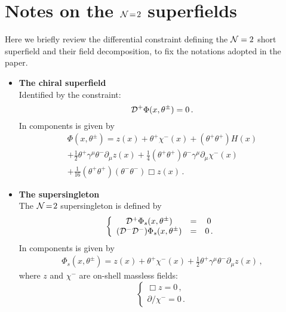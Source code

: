 \documentclass[a4paper,12pt]{article}
\newcommand{\ft}[2]{{\textstyle\frac{#1}{#2}}}
\begin{document}
\section{Notes on the ${\cal N}\!=\!2$ superfields}
Here we briefly review the differential constraint defining the
${\cal N}=2$ short superfield and their field decomposition, to
fix the notations adopted in the paper.
\begin{itemize}
\item {\bf The chiral superfield}\\
Identified by the constraint:
\begin{equation}
{\cal D}^+\Phi(x,\theta^{\pm})=0\,.
\end{equation}
In components is given by
\begin{eqnarray}
\Phi(x,\theta^{\pm})= z(x)+\theta^+\chi^-(x)
+(\theta^+\theta^+)H(x)\nonumber\\
+\ft{1}{2}\theta^+\gamma^\mu\theta^-\partial_\mu z(x)
+\ft{1}{4}(\theta^+\theta^+)\theta^-\gamma^\mu\partial_\mu\chi^-(x)\nonumber\\
+\ft{1}{16}(\theta^+\theta^+)(\theta^-\theta^-)\Box  z(x)\,.
\end{eqnarray}
\item {\bf The supersingleton}\\
The ${\cal N}\!=\!2$ supersingleton is defined by
\begin{equation}
\left\{\begin{array}{ccc}
{\cal D}^+\Phi_s(x,\theta^{\pm})&=&0\\
({\cal D}^-{\cal D}^-)\Phi_s(x,\theta^{\pm})&=&0\,.
\end{array}\right.
\end{equation}
In components is given by
\begin{eqnarray}
\Phi_s(x,\theta^{\pm})= z(x)+\theta^+\chi^-(x)
+\ft{1}{2}\theta^+\gamma^\mu\theta^-\partial_\mu z(x)\,,
\end{eqnarray}
where $z$ and $\chi^-$ are on-shell massless fields:
\begin{equation}
\left\{\begin{array}{c}
\Box z=0\,,\\
\partial\!\!\!/\chi^-=0\,.
\end{array}\right.

\end{equation}
\end{itemize}
\end{document}
